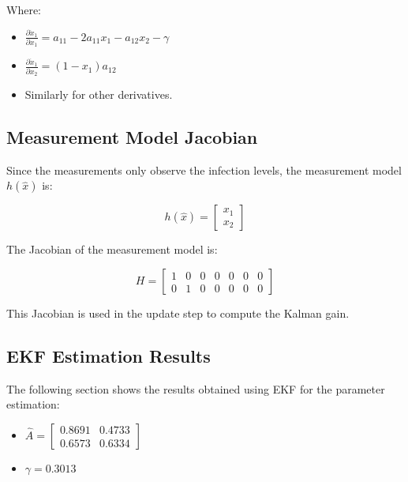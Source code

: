 \documentclass[a4paper,10pt]{report}
\begin{document}
Where:

\begin{itemize}
\item \(
\frac{\partial \dot{x}_1}{\partial x_1} = a_{11} - 2a_{11} x_1 - a_{12} x_2 - \gamma
\)
\item \(
\frac{\partial \dot{x}_1}{\partial x_2} = (1 - x_1) a_{12}
\)
\item Similarly for other derivatives.
\end{itemize}

\subsection{Measurement Model Jacobian}

Since the measurements only observe the infection levels, the measurement model \( h(\hat{x}) \) is:

\[
h(\hat{x}) = \begin{bmatrix} x_1 \\ x_2 \end{bmatrix}
\]

The Jacobian of the measurement model is:

\[
H = \begin{bmatrix} 1 & 0 & 0 & 0 & 0 & 0 & 0 \\ 0 & 1 & 0 & 0 & 0 & 0 & 0 \end{bmatrix}
\]

This Jacobian is used in the update step to compute the Kalman gain.

\subsection{EKF Estimation Results}
The following section shows the results obtained using EKF for the parameter estimation: 
\begin{itemize}
\item \( \hat{A} = \begin{bmatrix}  0.8691 & 0.4733 \\ 0.6573 &  0.6334\end{bmatrix} \) 
\item \( \gamma = 0.3013 \)
\end{itemize}
\end{document}
